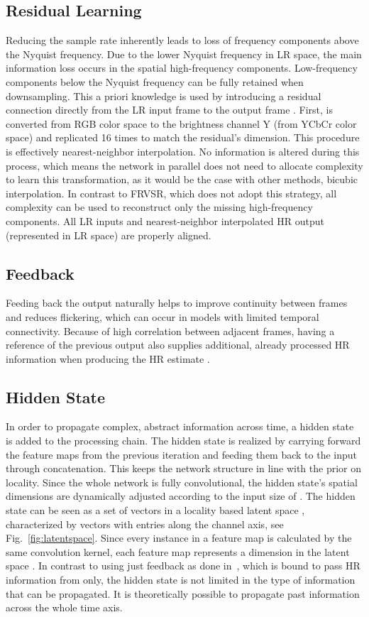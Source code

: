 \documentclass[10pt,twocolumn,letterpaper]{article}
\begin{document}
\subsection{Residual Learning}
\label{sec:residual_learning}
Reducing the sample rate inherently leads to loss of frequency components above the Nyquist frequency. Due to the lower Nyquist frequency in LR space, the main information loss occurs in the spatial high-frequency components. Low-frequency components below the Nyquist frequency can be fully retained when downsampling. This a priori knowledge is used by introducing a residual connection directly from the LR input frame  to the output frame . First,  is converted from RGB color space to the brightness channel Y (from YCbCr color space) and replicated 16 times to match the residual's dimension. This procedure is effectively nearest-neighbor interpolation. No information is altered during this process, which means the network in parallel does not need to allocate complexity to learn this transformation, as it would be the case with other methods, \eg bicubic interpolation. In contrast to FRVSR, which does not adopt this strategy, all complexity can be used to reconstruct only the missing high-frequency components. All LR inputs and nearest-neighbor interpolated HR output (represented in LR space) are properly aligned. 


\subsection{Feedback}
Feeding back the output naturally helps to improve continuity between frames and reduces flickering, which can occur in models with limited temporal connectivity. Because of high correlation between adjacent frames, having a reference of the previous output  also supplies additional, already processed HR information when producing the HR estimate . 

\subsection{Hidden State}
In order to propagate complex, abstract information across time, a hidden state  is added to the processing chain. The hidden state is realized by carrying forward the feature maps from the previous iteration and feeding them back to the input through concatenation. This keeps the network structure in line with the prior on locality.
Since the whole network is fully convolutional, the hidden state's spatial dimensions are dynamically adjusted according to the input size of . The hidden state can be seen as a set of vectors in a locality based latent space , characterized by vectors  with entries along the channel axis, see Fig.~\ref{fig:latentspace}. Since every instance in a feature map is calculated by the same convolution kernel, each feature map represents a dimension in the latent space . In contrast to using just feedback as done in~\cite{frvsr}, which is bound to pass HR information from  only, the hidden state is not limited in the type of information that can be propagated. It is theoretically possible to propagate past information across the whole time axis.
\end{document}
